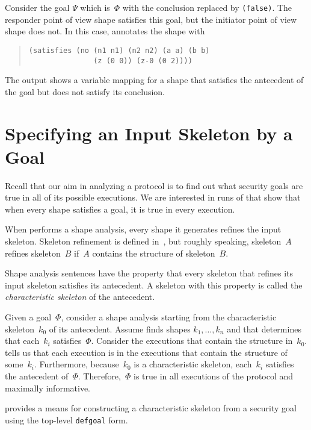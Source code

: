 \documentclass[12pt]{article}
\begin{document}
Consider the goal \(\Psi\) which is~\(\Phi\) with the conclusion replaced
by \texttt{(false)}.  The responder point of view shape satisfies this
goal, but the initiator point of view shape does not.  In this case,
{\cpsa} annotates the shape with
\begin{quote}
\begin{verbatim}
(satisfies (no (n1 n1) (n2 n2) (a a) (b b)
               (z (0 0)) (z-0 (0 2))))
\end{verbatim}
\end{quote}
The output shows a variable mapping for a shape that satisfies the
antecedent of the goal but does not satisfy its conclusion.

\section{Specifying an Input Skeleton by a Goal}\label{sec:specifying}

Recall that our aim in analyzing a protocol is to find out what
security goals are true in all of its possible executions.  We are
interested in runs of {\cpsa} that show that when every shape
satisfies a goal, it is true in every execution.

When {\cpsa} performs a shape analysis, every shape it generates
refines the input skeleton.  Skeleton refinement is defined
in~\cite[Section~6]{cpsaprimer09}, but roughly speaking, skeleton~$A$
refines skeleton~$B$ if~$A$ contains the structure of skeleton~$B$.

Shape analysis sentences have the property that every skeleton that
refines its input skeleton satisfies its antecedent.  A skeleton with
this property is called the \emph{characteristic skeleton} of the
antecedent.

Given a goal~\(\Phi\), consider a shape analysis starting from the
characteristic skeleton~$k_0$ of its antecedent.  Assume {\cpsa} finds
shapes $k_1,\ldots,k_n$ and that {\cpsa} determines that each~$k_i$
satisfies~$\Phi$.  Consider the executions that contain the structure
in~$k_0$.  {\cpsa} tells us that each execution is in the executions
that contain the structure of some~$k_i$.  Furthermore, because~$k_0$
is a characteristic skeleton, each~$k_i$ satisfies the antecedent
of~$\Phi$.  Therefore,~$\Phi$ is true in all executions of the
protocol and maximally informative.

{\cpsa} provides a means for constructing a characteristic skeleton
from a security goal using the top-level \texttt{defgoal} form.
\end{document}
